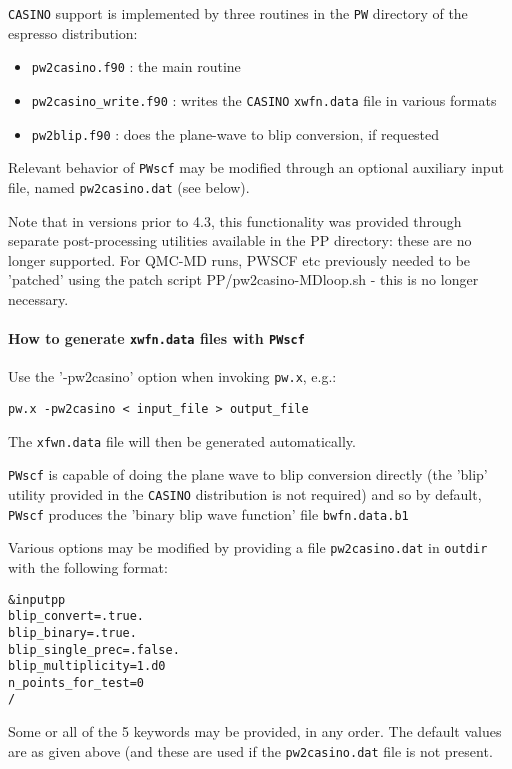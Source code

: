 \documentclass[12pt,a4paper]{article}
\def\pwx{\texttt{pw.x}}
\begin{document}
\texttt{CASINO} support is implemented by three routines in the \texttt{PW} directory of the
espresso distribution: 
\begin{itemize}
\item \texttt{pw2casino.f90} : the main routine     
\item \texttt{pw2casino\_write.f90} : writes the \texttt{CASINO} \texttt{xwfn.data} file in various formats
\item \texttt{pw2blip.f90} : does the plane-wave to blip conversion, if requested
\end{itemize}
Relevant behavior of \texttt{PWscf} may be modified through an optional auxiliary input 
file, named \texttt{pw2casino.dat} (see below).

Note that in versions prior to 4.3, this functionality was provided through
separate post-processing utilities available in the PP directory: these are 
no longer supported. For QMC-MD runs, PWSCF etc previously needed to be 
'patched' using the patch script PP/pw2casino-MDloop.sh - this is no longer 
necessary.

\paragraph{How to generate \texttt{xwfn.data} files with \texttt{PWscf}}
Use the '-pw2casino' option when invoking \pwx, e.g.: 
\begin{verbatim}
pw.x -pw2casino < input_file > output_file
\end{verbatim}
The \texttt{xfwn.data} file will then be generated automatically. 

\texttt{PWscf} is capable of doing the plane wave to blip conversion directly (the
'blip' utility provided in the \texttt{CASINO} distribution is not required) and so by
default, \texttt{PWscf} produces the 'binary blip wave function' file \texttt{bwfn.data.b1}

Various options may be modified by providing a file \texttt{pw2casino.dat} in \texttt{outdir}
with the following format: 
\begin{verbatim}
&inputpp
blip_convert=.true.
blip_binary=.true.
blip_single_prec=.false.
blip_multiplicity=1.d0
n_points_for_test=0
/
\end{verbatim}
Some or all of the 5 keywords may be provided, in any order. The default
values are as given above (and these are used if the \texttt{pw2casino.dat} file is
not present.
\end{document}

